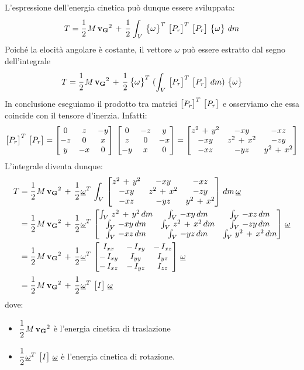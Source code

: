 L'espressione dell'energia cinetica può dunque essere sviluppata:
\[T =  \cfrac{1}{2}\,M\,\mathbf{v_G}^2 \,+\,\cfrac{1}{2}\,\int_V\, \begin{Bmatrix}\omega\end{Bmatrix}^T\,\begin{bmatrix}P_r\end{bmatrix}^T\,\begin{bmatrix}P_r\end{bmatrix}\,\begin{Bmatrix}\omega\end{Bmatrix}\,dm\]
Poiché la elocità angolare è costante, il vettore $\omega$ può essere estratto dal segno dell'integrale
\[T =  \cfrac{1}{2}\,M\,\mathbf{v_G}^2 \,+\,\cfrac{1}{2}\, \begin{Bmatrix}\omega\end{Bmatrix}^T\,(\int_V\,\begin{bmatrix}P_r\end{bmatrix}^T\,\begin{bmatrix}P_r\end{bmatrix}\,dm)\,\begin{Bmatrix}\omega\end{Bmatrix}\]
In conclusione eseguiamo il prodotto tra matrici $\begin{bmatrix}P_r\end{bmatrix}^T\,\begin{bmatrix}P_r\end{bmatrix}$ e osserviamo che essa coincide con il tensore d'inerzia. Infatti:
\[\begin{bmatrix}P_r\end{bmatrix}^T\,\begin{bmatrix}P_r\end{bmatrix} = \begin{bmatrix}0&z&-y\\-z&0&x\\y&-x&0\end{bmatrix}\,\begin{bmatrix}0&-z&y\\z&0&-x\\-y&x&0\end{bmatrix} = \begin{bmatrix}z^2\,+\,y^2&-xy&-xz\\-xy&z^2\,+\,x^2&-zy\\-xz&-yz&y^2\,+\,x^2\end{bmatrix}\]
L'integrale diventa dunque:
\begin{align*}
 T &= \cfrac{1}{2}\,M\,\mathbf{v_G}^2\,+\,\cfrac{1}{2}\,\underline{\omega}^T\,\int_V\,\begin{bmatrix}z^2\,+\,y^2&-xy&-xz\\-xy&z^2\,+\,x^2&-zy\\-xz&-yz&y^2\,+\,x^2\end{bmatrix}\,dm\,\underline{\omega}\\
 &= \cfrac{1}{2}\,M\,\mathbf{v_G}^2\,+\,\cfrac{1}{2}\,\underline{\omega}^T\,\begin{bmatrix}\int_V\,z^2\,+\,y^2\,dm&\int_V\,-xy\,dm&\int_V\,-xz\,dm\\\int_V\,-xy\,dm&\int_V\,z^2\,+\,x^2\,dm&\int_V\,-zy\,dm\\\int_V\,-xz\,dm&\int_V\,-yz\,dm&\int_V\,y^2\,+\,x^2\,dm\end{bmatrix}\,\underline{\omega}\\
 &=  \cfrac{1}{2}\,M\,\mathbf{v_G}^2\,+\,\cfrac{1}{2}\,\underline{\omega}^T\,\begin{bmatrix}I_{xx}&-\,I_{xy}&-\,I_{xz}\\-\,I_{xy}&I_{yy}&I_{yz}\\-\,I_{xz}&-\,I_{yz}&I_{zz}\end{bmatrix}\,\underline{\omega}\\
  &=  \cfrac{1}{2}\,M\,\mathbf{v_G}^2\,+\,\cfrac{1}{2}\,\underline{\omega}^T\,\begin{bmatrix}I\end{bmatrix}\,\underline{\omega}
 \end{align*}
 dove:
 \begin{itemize}
 \item $ \cfrac{1}{2}\,M\,\mathbf{v_G}^2$ è l'energia cinetica di traslazione
 \item $\cfrac{1}{2}\,\underline{\omega}^T\,\begin{bmatrix}I\end{bmatrix}\,\underline{\omega}$ è l'energia cinetica di rotazione.
 \end{itemize}
 
